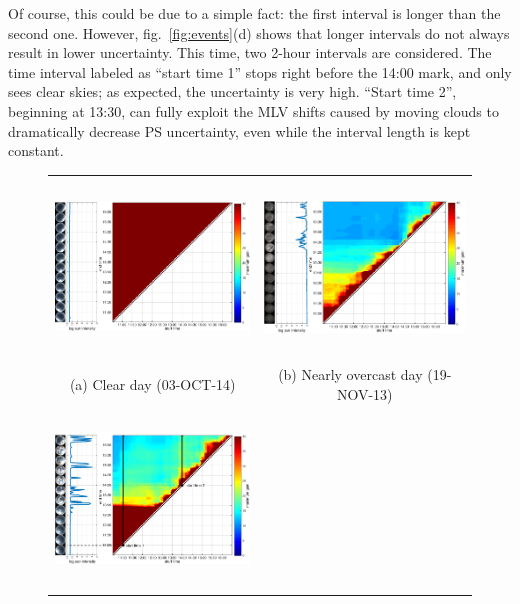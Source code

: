 Of course, this could be due to a simple fact: the first interval is longer than the second one. However, fig.~\ref{fig:events}(d) shows that longer intervals do not always result in lower uncertainty. This time, two 2-hour intervals are considered. The time interval labeled as ``start time 1'' stops right before the 14:00 mark, and only sees clear skies; as expected, the uncertainty is very high. ``Start time 2'', beginning at 13:30, can fully exploit the MLV shifts caused by moving clouds to dramatically decrease PS uncertainty, even while the interval length is kept constant.
  
\begin{figure}[!th]
\centering
\footnotesize
\setlength{\tabcolsep}{0pt}
\begin{tabular}{cc}
\includegraphics[height=4.7cm]{./figures/events/events-20141003-colorbar.pdf} & 
\includegraphics[height=4.7cm]{./figures/events/events-20131119-colorbar.pdf} \\
(a) Clear day (03-OCT-14) & (b) Nearly overcast day (19-NOV-13) \\%
\includegraphics[height=4.7cm]{./figures/events/events-20130824-colorbar.pdf} & 

\end{tabular}
\end{figure}
